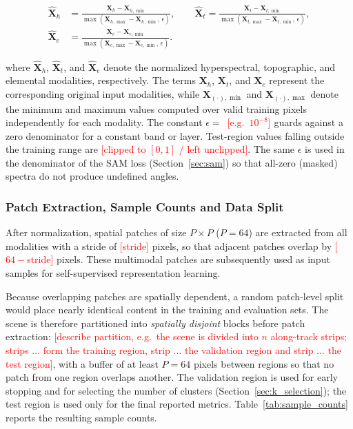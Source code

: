 \documentclass[pdflatex,sn-mathphys-num]{sn-jnl}
\newcommand{\fillin}[1]{\textcolor{red}{[#1]}}
\begin{document}
\[
\begin{aligned}
\hat{\mathbf{X}}_{h} &=
\frac{\mathbf{X}_{h}-\mathbf{X}_{h,\min}}
{\max(\mathbf{X}_{h,\max}-\mathbf{X}_{h,\min},\,\epsilon)},
\qquad
\hat{\mathbf{X}}_{t}=
\frac{\mathbf{X}_{t}-\mathbf{X}_{t,\min}}
{\max(\mathbf{X}_{t,\max}-\mathbf{X}_{t,\min},\,\epsilon)},\\[3pt]
\hat{\mathbf{X}}_{e} &=
\frac{\mathbf{X}_{e}-\mathbf{X}_{e,\min}}
{\max(\mathbf{X}_{e,\max}-\mathbf{X}_{e,\min},\,\epsilon)}.
\end{aligned}
\]

where \(\hat{\mathbf{X}}_{h}\), \(\hat{\mathbf{X}}_{t}\), and \(\hat{\mathbf{X}}_{e}\) denote the normalized hyperspectral, topographic, and elemental modalities, respectively. The terms \(\mathbf{X}_{h}\), \(\mathbf{X}_{t}\), and \(\mathbf{X}_{e}\) represent the corresponding original input modalities, while \(\mathbf{X}_{(\cdot),\min}\) and \(\mathbf{X}_{(\cdot),\max}\) denote the minimum and maximum values computed over valid training pixels independently for each modality. The constant $\epsilon=$~\fillin{e.g.\ $10^{-8}$} guards against a zero denominator for a constant band or layer. Test-region values falling outside the training range are \fillin{clipped to $[0,1]$ / left unclipped}. The same $\epsilon$ is used in the denominator of the SAM loss (Section~\ref{sec:sam}) so that all-zero (masked) spectra do not produce undefined angles.

\subsubsection{Patch Extraction, Sample Counts and Data Split}
\label{sec:split}

After normalization, spatial patches of size \(P \times P\) ($P=64$) are extracted from all modalities with a stride of \fillin{stride} pixels, so that adjacent patches overlap by \fillin{$64-$stride} pixels. These multimodal patches are subsequently used as input samples for self-supervised representation learning.

Because overlapping patches are spatially dependent, a random patch-level split would place nearly identical content in the training and evaluation sets. The scene is therefore partitioned into \emph{spatially disjoint} blocks before patch extraction: \fillin{describe partition, e.g.\ the scene is divided into $n$ along-track strips; strips $\ldots$ form the training region, strip $\ldots$ the validation region and strip $\ldots$ the test region}, with a buffer of at least $P=64$ pixels between regions so that no patch from one region overlaps another. The validation region is used for early stopping and for selecting the number of clusters (Section~\ref{sec:k_selection}); the test region is used only for the final reported metrics. Table~\ref{tab:sample_counts} reports the resulting sample counts.
\end{document}

